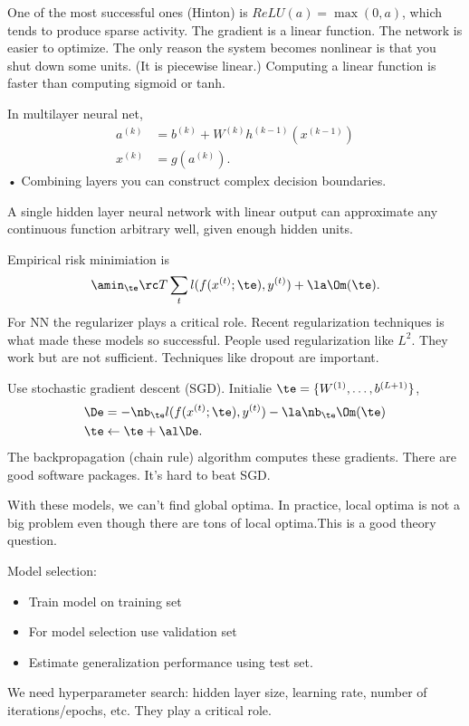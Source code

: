 One of the most successful ones (Hinton) is $ReLU(a) = \max(0,a)$, which tends to produce sparse activity. The gradient is a linear function. The network is easier to optimize. The only reason the system becomes nonlinear is that you shut down some units. (It is piecewise linear.) Computing a linear function is faster than computing sigmoid or tanh.

In multilayer neural net, 
\begin{align}
a^{(k)} & = b^{(k)} + W^{(k)} h^{(k-1)} (x^{(k-1)})\\
x^{(k)} &= g(a^{(k)}).
\end{align}•
Combining layers you can construct complex decision boundaries.

\begin{thm} A single hidden layer neural network with linear output can approximate  any continuous function arbitrary well, given enough hidden units.
\end{thm}

Empirical risk minimiation is
$$
\amin_\te \rc T\sum_t l(f(x^{(t)}; \te), y^{(t)}) + \la \Om(\te).
$$
For NN the regularizer plays a critical role. Recent regularization techniques is what made these models so successful. People used regularization like $L^2$. They work but are not sufficient. Techniques like dropout  are important.

Use stochastic gradient descent (SGD). Initialie $\te = \{W^{(1)}, \ldots, b^{(L+1)}\}$, 
\begin{align}
\De & = -\nb_\te l(f(x^{(t)};\te),y^{(t)}) - \la \nb_\te \Om(\te)\\
\te &\leftarrow \te + \al \De.
\end{align}
The backpropagation (chain rule) algorithm computes these gradients. There are good software packages. It's hard to beat SGD.

With these models, we can't find global optima. 
In practice, local optima is not a big problem even though there are tons of local optima.This is a good theory question. 

Model selection: 
\begin{itemize}
\item
Train model on training set
\item
For model selection use validation set
\item
Estimate generalization performance using test set.
\end{itemize}
We need hyperparameter search: hidden layer size, learning rate, number of iterations/epochs, etc. They play a critical role.


